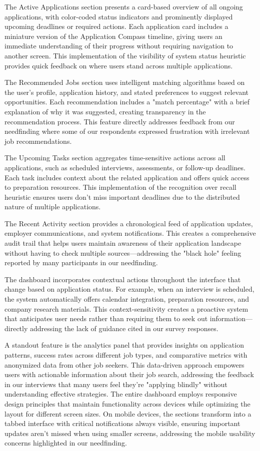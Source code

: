 \documentclass[
	letterpaper, %
]{jdf}
\begin{document}
The Active Applications section presents a card-based overview of all ongoing applications, with color-coded status indicators and prominently displayed upcoming deadlines or required actions. Each application card includes a miniature version of the Application Compass timeline, giving users an immediate understanding of their progress without requiring navigation to another screen. This implementation of the visibility of system status heuristic provides quick feedback on where users stand across multiple applications.

The Recommended Jobs section uses intelligent matching algorithms based on the user's profile, application history, and stated preferences to suggest relevant opportunities. Each recommendation includes a "match percentage" with a brief explanation of why it was suggested, creating transparency in the recommendation process. This feature directly addresses feedback from our needfinding where some of our respondents expressed frustration with irrelevant job recommendations.

The Upcoming Tasks section aggregates time-sensitive actions across all applications, such as scheduled interviews, assessments, or follow-up deadlines. Each task includes context about the related application and offers quick access to preparation resources. This implementation of the recognition over recall heuristic ensures users don't miss important deadlines due to the distributed nature of multiple applications.

The Recent Activity section provides a chronological feed of application updates, employer communications, and system notifications. This creates a comprehensive audit trail that helps users maintain awareness of their application landscape without having to check multiple sources—addressing the "black hole" feeling reported by many participants in our needfinding.

The dashboard incorporates contextual actions throughout the interface that change based on application status. For example, when an interview is scheduled, the system automatically offers calendar integration, preparation resources, and company research materials. This context-sensitivity creates a proactive system that anticipates user needs rather than requiring them to seek out information—directly addressing the lack of guidance cited in our survey responses.

A standout feature is the analytics panel that provides insights on application patterns, success rates across different job types, and comparative metrics with anonymized data from other job seekers. This data-driven approach empowers users with actionable information about their job search, addressing the feedback in our interviews that many users feel they're "applying blindly" without understanding effective strategies. The entire dashboard employs responsive design principles that maintain functionality across devices while optimizing the layout for different screen sizes. On mobile devices, the sections transform into a tabbed interface with critical notifications always visible, ensuring important updates aren't missed when using smaller screens, addressing the mobile usability concerns highlighted in our needfinding.
\end{document}
